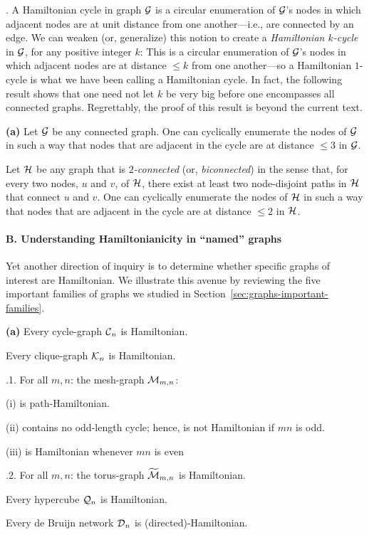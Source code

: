 .
A Hamiltonian cycle in graph $\mbox{$\cal G$}$ is a circular enumeration of $\mbox{$\cal G$}$'s
nodes in which adjacent nodes are at unit distance from one
another---i.e., are connected by an edge.  We can weaken (or,
generalize) this notion to create a {\it Hamiltonian $k$-cycle}
 in $\mbox{$\cal G$}$, for any positive integer
$k$: This is a circular enumeration of $\mbox{$\cal G$}$'s nodes in which adjacent
nodes are at distance $\leq k$ from one another---so a Hamiltonian
$1$-cycle is what we have been calling a Hamiltonian cycle.  In fact,
the following result shows that one need not let $k$ be very big
before one encompasses all connected graphs.  Regrettably, the proof
of this result is beyond the current text.

\begin{prop}
\label{thm:weak-Hamiltonianicity}
{\bf (a)} {\rm \cite{ChartrandK69}}
Let $\mbox{$\cal G$}$ be any connected graph.  One can cyclically enumerate the
nodes of $\mbox{$\cal G$}$ in such a way that nodes that are adjacent in the cycle
are at distance $\leq 3$ in $\mbox{$\cal G$}$.


 {\rm  \cite{Fleischner74}}
Let $\mbox{$\cal H$}$ be any graph that is {\em $2$-connected}
  (or, {\it
  biconnected}) in the sense that, for every two nodes, $u$ and $v$,
of $\mbox{$\cal H$}$, there exist at least two node-disjoint paths in $\mbox{$\cal H$}$ that
connect $u$ and $v$.  One can cyclically enumerate the nodes of $\mbox{$\cal H$}$
in such a way that nodes that are adjacent in the cycle are at
distance $\leq 2$ in $\mbox{$\cal H$}$.
\end{prop}

\paragraph{\small\sf B. Understanding Hamiltonianicity in ``named'' graphs}

Yet another direction of inquiry is to determine whether specific
graphs of interest are Hamiltonian.  We illustrate this avenue by
reviewing the five important families of graphs we studied in
Section~\ref{sec:graphs-important-families}.

\begin{prop}
\label{thm:named-graph-Hamiltonian}
{\bf (a)}
Every cycle-graph $\mbox{$\cal C$}_n$ is Hamiltonian.

Every clique-graph $\mbox{$\cal K$}_n$ is Hamiltonian.

.1.
For all $m,n$: the mesh-graph $\mbox{$\cal M$}_{m,n}$:

(i)  is path-Hamiltonian.

(ii) contains no odd-length cycle; hence, is not Hamiltonian if $mn$
is odd.

(iii) is Hamiltonian whenever $mn$ is even 

.2.
For all $m,n$: the torus-graph $\widetilde{\mbox{$\cal M$}}_{m,n}$ is Hamiltonian.

Every hypercube $\mbox{$\cal Q$}_n$  is Hamiltonian.

Every de Bruijn network $\mbox{$\cal D$}_n$ is (directed)-Hamiltonian.
\end{prop}

